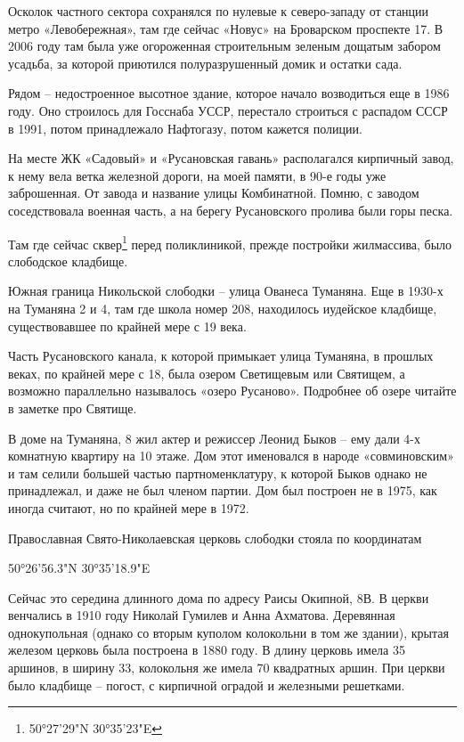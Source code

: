 Осколок частного сектора сохранялся по нулевые к северо-западу от станции метро «Левобережная», там где сейчас «Новус» на Броварском проспекте 17. В 2006 году там была уже огороженная строительным зеленым дощатым забором усадьба, за которой приютился полуразрушенный домик и остатки сада.

Рядом – недостроенное высотное здание, которое начало возводиться еще в 1986 году. Оно строилось для Госснаба УССР, перестало строиться с распадом СССР в 1991, потом принадлежало Нафтогазу, потом кажется полиции.

На месте ЖК «Садовый» и «Русановская гавань» располагался кирпичный завод, к нему вела ветка железной дороги, на моей памяти, в 90-е годы уже заброшенная. От завода и название улицы Комбинатной. Помню, с заводом соседствовала военная часть, а на берегу Русановского пролива были горы песка.

Там где сейчас сквер\footnote{50°27'29"N 30°35'23"E} перед поликлиникой, прежде постройки жилмассива, было слободское кладбище.

Южная граница Никольской слободки – улица Ованеса Туманяна. Еще в 1930-х на Туманяна 2 и 4, там где школа номер 208, находилось иудейское кладбище, существовавшее по крайней мере с 19 века.

Часть Русановского канала, к которой примыкает улица Туманяна, в прошлых веках, по крайней мере с 18, была озером Светищевым или Святищем, а возможно параллельно называлось «озеро Русаново». Подробнее об озере читайте в заметке про Святище.

В доме на Туманяна, 8 жил актер и режиссер Леонид Быков – ему дали 4-х комнатную квартиру на 10 этаже. Дом этот именовался в народе «совминовским» и там селили большей частью партноменклатуру, к которой Быков однако не принадлежал, и даже не был членом партии. Дом был построен не в 1975, как иногда считают, но по крайней мере в 1972.

Православная Свято-Николаевская церковь слободки стояла по координатам

50°26'56.3"N 30°35'18.9"E

Сейчас это середина длинного дома по адресу Раисы Окипной, 8В. В церкви венчались в 1910 году Николай Гумилев и Анна Ахматова. Деревянная однокупольная (однако со вторым куполом колокольни в том же здании), крытая железом церковь была построена в 1880 году. В длину церковь имела 35 аршинов, в ширину 33, колокольня же имела 70 квадратных аршин. При церкви было кладбище – погост, с кирпичной оградой и железными решетками. 

